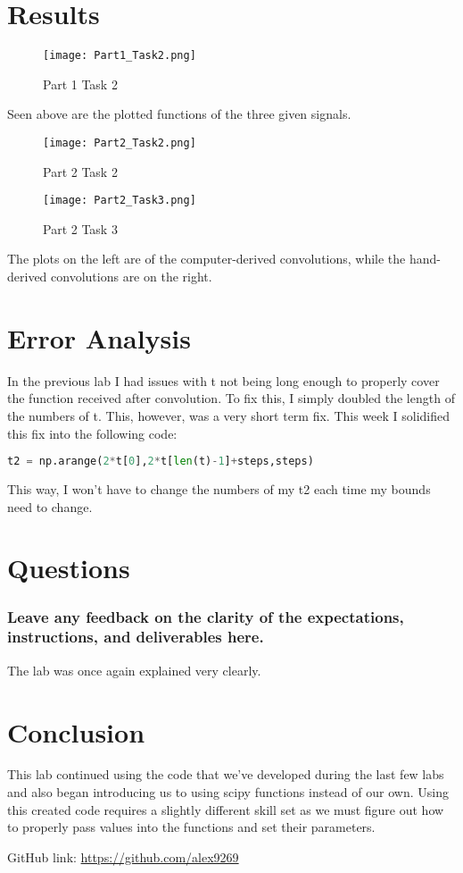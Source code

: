 \documentclass[12pt]{report}
\begin{document}
 \section{Results}
 
  \begin{figure}[H]
    \centering
    \texttt{[image: Part1\_Task2.png]}
    \caption{Part 1 Task 2}
\end{figure}
Seen above are the plotted functions of the three given signals. 
\newpage
\begin{multicols}{2}
\begin{figure}[H]
    \centering
    \texttt{[image: Part2\_Task2.png]}
    \caption{Part 2 Task 2}
\end{figure}
\begin{figure}[H]
    \centering
    \texttt{[image: Part2\_Task3.png]}
    \caption{Part 2 Task 3}
\end{figure}
\end{multicols}
The plots on the left are of the computer-derived convolutions, while the hand-derived convolutions are on the right.
 
 \section{Error Analysis}
 
 In the previous lab I had issues with t not being long enough to properly cover the function received after convolution. To fix this, I simply doubled the length of the numbers of t. This, however, was a very short term fix. This week I solidified this fix into the following code:
 \begin{lstlisting}[language=Python]
 t2 = np.arange(2*t[0],2*t[len(t)-1]+steps,steps)
 \end{lstlisting}
 This way, I won't have to change the numbers of my t2 each time my bounds need to change.
 
 \section{Questions}
 \subsubsection{Leave any feedback on the clarity of the expectations, instructions, and deliverables here.}
 
 The lab was once again explained very clearly.
 
 \section{Conclusion}
 
 This lab continued using the code that we've developed during the last few labs and also began introducing us to using scipy functions instead of our own. Using this created code requires a slightly different skill set as we must figure out how to properly pass values into the functions and set their parameters. 
 
 
 GitHub link: \url{https://github.com/alex9269}
 
\end{document}
